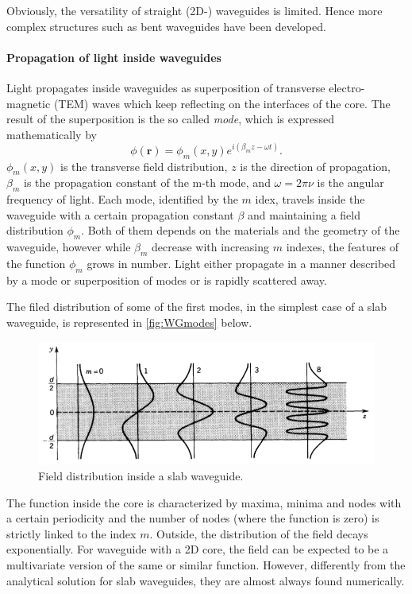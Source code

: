 Obviously, the versatility of straight (2D-) waveguides is limited.
Hence more complex structures such as bent waveguides have been developed.

\paragraph{Propagation of light inside waveguides\\}
\noindent Light propagates inside waveguides as superposition of transverse electro-magnetic (TEM) waves which keep reflecting on the interfaces of the core.
The result of the superposition is the so called \textit{mode}, which is expressed mathematically by
\begin{equation}
	\phi(\textbf{r}) = \phi_m\left( x, y \right) e^{i\left( \beta_m z - \omega t\right)}.
\end{equation}
$\phi_m\left( x, y \right)$ is the transverse field distribution, $z$ is the direction of propagation, $\beta_m$ is the propagation constant of the m-th mode, and $\omega=2\pi \nu$ is the angular frequency of light.
Each mode, identified by the $m$ idex, travels inside the waveguide with a certain propagation constant $\beta$ and maintaining a field distribution $\phi_m$.
Both of them depends on the materials and the geometry of the waveguide, however while $\beta_m$ decrease with increasing $m$ indexes, the features of the function $\phi_m$ grows in number.
Light either propagate in a manner described by a mode or superposition of modes or is rapidly scattered away.

The filed distribution of some of the first modes, in the simplest case of a slab waveguide, is represented in \autoref{fig:WGmodes} below.
\begin{figure}[ht]
	\centering
	\includegraphics[scale=0.8]{figures/modes.png}
	\caption{Field distribution inside a slab waveguide.}
	\label{fig:WGmodes}
\end{figure}
The function inside the core is characterized by maxima, minima and nodes with a certain periodicity and the number of nodes (where the function is zero) is strictly linked to the index $m$.
Outside, the distribution of the field decays exponentially.
For waveguide with a 2D core, the field can be expected to be a multivariate version of the same or similar function.
However, differently from the analytical solution for slab waveguides, they are almost always found numerically.


